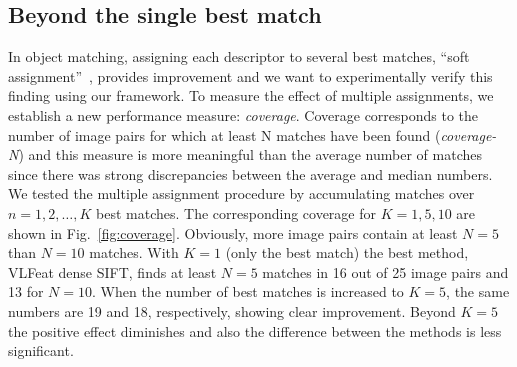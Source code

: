 \documentclass[10pt,journal,cspaper,compsoc]{IEEEtran}
\begin{document}
%
\subsection{Beyond the single best match}
%
In object matching, assigning each descriptor to several best matches,
``soft assignment''~\cite{AgaTri:2008,TuySch:2007,ChaLemVed:2011},
provides improvement and we want to experimentally verify this
finding using our framework. To measure the effect of multiple assignments, we
establish a new performance measure: \textit{coverage}. Coverage
corresponds to the number of image pairs for which at least N matches
have been found ({\em coverage-N}) and this measure is more meaningful
than the average number of matches since there was strong discrepancies
between the average and median numbers.
We tested the multiple assignment procedure by accumulating matches over
$n = 1, 2, \ldots, K$ best matches. The corresponding coverage for
$K = 1, 5, 10$ are shown in Fig.~\ref{fig:coverage}. Obviously,
more image pairs contain at least $N=5$ than $N=10$ matches.
With $K=1$ (only the best match) the best method, VLFeat dense SIFT,
finds at least $N=5$ matches in 16 out of
25 image pairs and 13 for $N=10$. When the number of best
matches is increased to $K=5$, the same numbers are 19 and 18, respectively,
showing clear improvement. Beyond $K=5$ the positive effect diminishes and
also the difference between the methods is less significant.
%
\end{document}
